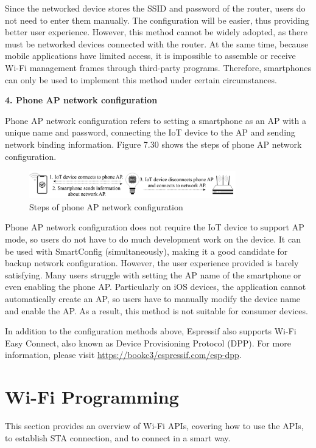 \documentclass[a4paper,12pt,openany]{book}
\begin{document}
Since the networked device stores the SSID and password of the router, users do not need to enter them manually. The configuration will be easier, thus providing better user experience. However, this method cannot be widely adopted, as there must be networked devices connected with the router. At the same time, because mobile applications have limited access, it is impossible to assemble or receive Wi-Fi management frames through third-party programs. Therefore, smartphones can only be used to implement this method under certain circumstances.

\textbf{4. Phone AP network configuration}

Phone AP network configuration refers to setting a smartphone as an AP with a unique name and password, connecting the IoT device to the AP and sending network binding information. Figure 7.30 shows the steps of phone AP network configuration.

\begin{figure}[!h]
    \centering
    \includegraphics[width=0.8\textwidth]{D7Z/7-30}
    \caption{Steps of phone AP network configuration}
\end{figure}

Phone AP network configuration does not require the IoT device to support AP mode, so users do not have to do much development work on the device. It can be used with SmartConfig (simultaneously), making it a good candidate for backup network configuration. However, the user experience provided is barely satisfying. Many users struggle with setting the AP name of the smartphone or even enabling the phone AP. Particularly on iOS devices, the application cannot automatically create an AP, so users have to manually modify the device name and enable the AP. As a result, this method is not suitable for consumer devices.

In addition to the configuration methods above, Espressif also supports Wi-Fi Easy Connect, also known as Device Provisioning Protocol (DPP). For more information, please visit \url{https://bookc3/espressif.com/esp-dpp}.

\section{Wi-Fi Programming}
This section provides an overview of Wi-Fi APIs, covering how to use the APIs, to establish STA connection, and to connect in a smart way.
\end{document}
